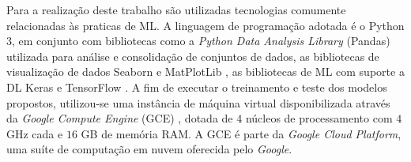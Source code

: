 
Para a realização deste trabalho são utilizadas tecnologias comumente relacionadas às praticas de ML. A linguagem de programação adotada é o Python 3, em conjunto com bibliotecas como a \emph{Python Data Analysis Library} (Pandas) \cite{pandas} utilizada para análise e consolidação de conjuntos de dados, as bibliotecas de visualização de dados Seaborn \cite{seaborn} e MatPlotLib \cite{matplotlib}, as bibliotecas de ML com suporte a DL Keras \cite{keras} e TensorFlow \cite{tensorflow}. A fim de executar o treinamento e teste dos modelos propostos, utilizou-se uma instância de máquina virtual disponibilizada através da \emph{Google Compute Engine} (GCE) \cite{gce}, dotada de $4$ núcleos de processamento com $4$ GHz cada e $16$ GB de memória RAM. A GCE é parte da \emph{Google Cloud Platform}, uma suíte de computação em nuvem oferecida pelo \emph{Google}.
